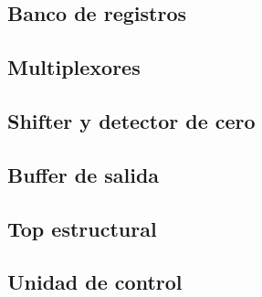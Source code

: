 \documentclass[llncs]{llncs}
\begin{document}
\subsection{Banco de registros}


\subsection{Multiplexores}



\subsection{Shifter y detector de cero}



\subsection{Buffer de salida}


\subsection{Top estructural}


\subsection{Unidad de control}

\end{document}

